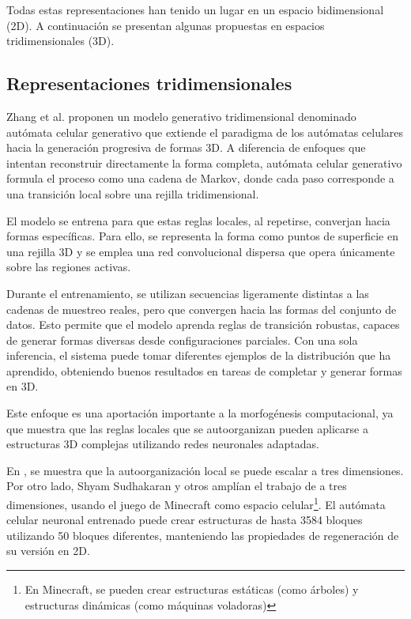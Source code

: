 Todas estas representaciones han tenido un lugar en un espacio bidimensional (2D). A continuación se presentan algunas propuestas en espacios tridimensionales (3D). 

\subsection{Representaciones tridimensionales}

Zhang et al. \cite{GCA} proponen un modelo generativo tridimensional denominado autómata celular generativo que extiende el paradigma de los autómatas celulares hacia la generación progresiva de formas 3D. A diferencia de enfoques que intentan reconstruir directamente la forma completa, autómata celular generativo formula el proceso como una cadena de Markov, donde cada paso corresponde a una transición local sobre una rejilla tridimensional. 

El modelo se entrena para que estas reglas locales, al repetirse, converjan hacia formas específicas. Para ello, se representa la forma como puntos de superficie en una rejilla 3D y se emplea una red convolucional dispersa que opera únicamente sobre las regiones activas.

Durante el entrenamiento, se utilizan secuencias ligeramente distintas a las cadenas de muestreo reales, pero que convergen hacia las formas del conjunto de datos. Esto permite que el modelo aprenda reglas de transición robustas, capaces de generar formas diversas desde configuraciones parciales. Con una sola inferencia, el sistema puede tomar diferentes ejemplos de la distribución que ha aprendido, obteniendo buenos resultados en tareas de completar y generar formas en 3D.

Este enfoque es una aportación importante a la morfogénesis computacional, ya que muestra que las reglas locales que se autoorganizan pueden aplicarse a estructuras 3D complejas utilizando redes neuronales adaptadas.

En \cite{GCA}, se muestra que la autoorganización local se puede escalar a tres dimensiones. Por otro lado, Shyam Sudhakaran y otros \cite{NCA3D} amplían el trabajo de \cite{mordvintsevNCA} a tres dimensiones, usando el juego de Minecraft como espacio celular\footnote{En Minecraft, se pueden crear estructuras estáticas (como árboles) y estructuras dinámicas (como máquinas voladoras)}. El autómata celular neuronal entrenado puede crear estructuras de hasta 3584 bloques utilizando 50 bloques diferentes, manteniendo las propiedades de regeneración de su versión en 2D.

